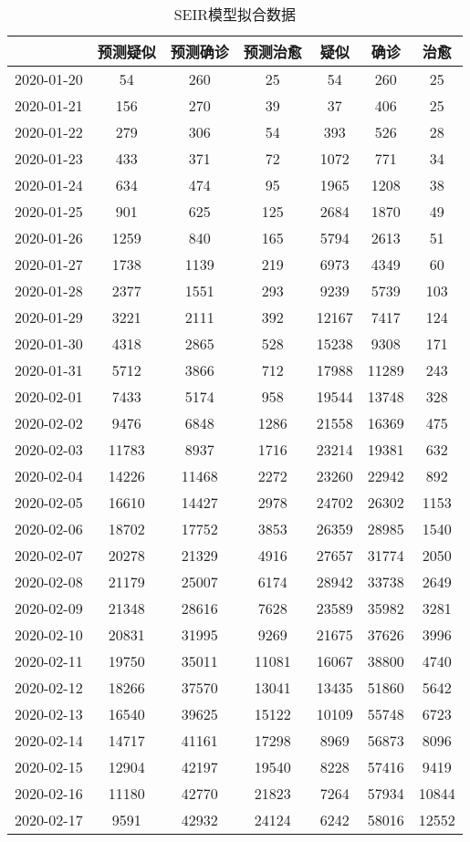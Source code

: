 \begin{longtable}{ccccccc}
\caption{SEIR模型拟合数据}\\
\hline
&预测疑似&预测确诊&预测治愈&疑似&确诊&治愈\\
\hline
2020-01-20&54&260&25&54&260&25\\
2020-01-21&156&270&39&37&406&25\\
2020-01-22&279&306&54&393&526&28\\
2020-01-23&433&371&72&1072&771&34\\
2020-01-24&634&474&95&1965&1208&38\\
2020-01-25&901&625&125&2684&1870&49\\
2020-01-26&1259&840&165&5794&2613&51\\
2020-01-27&1738&1139&219&6973&4349&60\\
2020-01-28&2377&1551&293&9239&5739&103\\
2020-01-29&3221&2111&392&12167&7417&124\\
2020-01-30&4318&2865&528&15238&9308&171\\
2020-01-31&5712&3866&712&17988&11289&243\\
2020-02-01&7433&5174&958&19544&13748&328\\
2020-02-02&9476&6848&1286&21558&16369&475\\
2020-02-03&11783&8937&1716&23214&19381&632\\
2020-02-04&14226&11468&2272&23260&22942&892\\
2020-02-05&16610&14427&2978&24702&26302&1153\\
2020-02-06&18702&17752&3853&26359&28985&1540\\
2020-02-07&20278&21329&4916&27657&31774&2050\\
2020-02-08&21179&25007&6174&28942&33738&2649\\
2020-02-09&21348&28616&7628&23589&35982&3281\\
2020-02-10&20831&31995&9269&21675&37626&3996\\
2020-02-11&19750&35011&11081&16067&38800&4740\\
2020-02-12&18266&37570&13041&13435&51860&5642\\
2020-02-13&16540&39625&15122&10109&55748&6723\\
2020-02-14&14717&41161&17298&8969&56873&8096\\
2020-02-15&12904&42197&19540&8228&57416&9419\\
2020-02-16&11180&42770&21823&7264&57934&10844\\
2020-02-17&9591&42932&24124&6242&58016&12552\\

\end{longtable}
